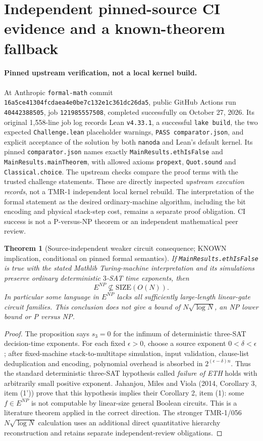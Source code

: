 \documentclass[11pt]{article}
\newtheorem{theorem}{Theorem}
\begin{document}
\section{Independent pinned-source CI evidence and a known-theorem fallback}
\paragraph{Pinned upstream verification, not a local kernel build.}
At Anthropic \texttt{formal-math} commit
\texttt{16a5ce41304fcdaea4e0be7c132e1c361dc26da5}, public
GitHub Actions run \texttt{40442388505}, job \texttt{121985557508},
completed successfully on October 27, 2026.
Its original 1,558-line job log records Lean \texttt{v4.33.1},
a successful \texttt{lake build}, the two expected
\texttt{Challenge.lean} placeholder warnings, \texttt{PASS comparator.json},
and explicit acceptance of the solution by both \texttt{nanoda} and
Lean's default kernel. Its pinned \texttt{comparator.json} names exactly
\texttt{MainResults.ethIsFalse} and \texttt{MainResults.mainTheorem},
with allowed axioms \texttt{propext}, \texttt{Quot.sound} and
\texttt{Classical.choice}. The upstream checks compare the proof terms
with the trusted challenge statements. These are directly inspected
\emph{upstream execution records}, not a TMR-1 independent local kernel
rebuild. The interpretation of the formal statement as the desired
ordinary-machine algorithm, including the bit encoding and physical
stack-step cost, remains a separate proof obligation. CI success is
not a P-versus-NP theorem or an independent mathematical peer review.

\begin{theorem}[Source-independent weaker circuit consequence;
KNOWN implication, conditional on pinned formal semantics]
If \texttt{MainResults.ethIsFalse} is true with the stated
Mathlib Turing-machine interpretation and its simulations preserve
ordinary deterministic $3$-SAT time exponents, then
\[
 E^{NP}\not\subseteq \mathrm{SIZE}(O(N)).
\]
In particular some language in $E^{NP}$ lacks all sufficiently
large-length linear-gate circuit families. This conclusion does not
give a bound of $N\sqrt{\log N}$, an NP lower bound or P versus NP.
\end{theorem}
\begin{proof}
The proposition says $s_3=0$ for the infimum of deterministic
three-SAT decision-time exponents. For each fixed $\epsilon>0$,
choose a source exponent $0<\delta<\epsilon$; after fixed-machine
stack-to-multitape simulation, input validation, clause-list
deduplication and encoding, polynomial overhead is absorbed in
$2^{(\epsilon-\delta)n}$. Thus the standard deterministic
three-SAT hypothesis called \emph{failure of ETH} holds with
arbitrarily small positive exponent. Jahanjou, Miles and Viola
(2014, Corollary 3, item (1')) prove that this hypothesis implies
their Corollary 2, item (1): some $f\in E^{NP}$ is not
computable by linear-size general Boolean circuits. This is a
literature theorem applied in the correct direction. The stronger
TMR-1/056 $N\sqrt{\log N}$ calculation uses an additional direct
quantitative hierarchy reconstruction and retains separate
independent-review obligations.
\end{proof}
\end{document}
